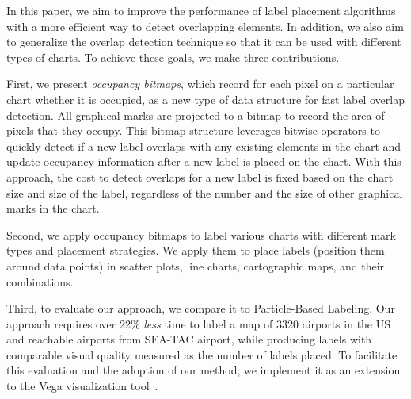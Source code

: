 In this paper, we aim to improve the performance of label placement algorithms
with a more efficient way to detect overlapping elements.
In addition, we also aim to generalize the overlap detection technique so that it can be used with different types of charts.
To achieve these goals, we make three contributions.

First, we present \emph{occupancy bitmaps}, which record for each pixel on a particular chart whether it is occupied, as a new type of data structure for fast label overlap detection.
All graphical marks are projected to a bitmap to record the area of pixels that they occupy.
This bitmap structure leverages bitwise operators to quickly detect if a new label overlaps with any existing elements in the chart and update occupancy information after a new label is placed on the chart.
With this approach, the cost to detect overlaps for a new label is fixed based on the chart size and size of the label, regardless of the number and the size of other graphical marks in the chart.

Second, we apply occupancy bitmaps to label various charts with different mark types and placement strategies.
We apply them to place labels (\ie position them around data points) in scatter plots, line charts, cartographic maps, and their combinations.

Third, to evaluate our approach, we compare it to Particle-Based Labeling.
Our approach requires over 22\% \emph{less} time to label a map of 3320 airports in the US and reachable airports from SEA-TAC airport,
while producing labels with comparable visual quality measured as the number of labels placed.
To facilitate this evaluation and the adoption of our method, we implement it as an extension to the Vega visualization tool~\cite{satyanarayan:vega}.
